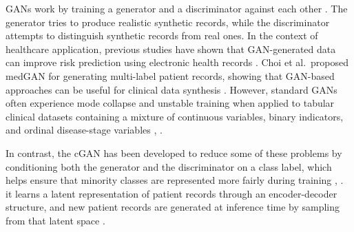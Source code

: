 GANs work by training a generator and a discriminator against each other \cite{vega2020}. The generator tries to produce realistic synthetic records, while the discriminator attempts to distinguish synthetic records from real ones. In the context of healthcare application, previous studies have shown that GAN-generated data can improve risk prediction using electronic health records \cite{che2017}. Choi et al.\ proposed medGAN for generating multi-label patient records, showing that GAN-based approaches can be useful for clinical data synthesis \cite{choi2017}. However, standard GANs often experience mode collapse and unstable training when applied to tabular clinical datasets containing a mixture of continuous variables, binary indicators, and ordinal disease-stage variables \cite{lenz2021}, \cite{espinosa2023}.

In contrast, the cGAN has been developed to reduce some of these problems by conditioning both the generator and the discriminator on a class label, which helps ensure that minority classes are represented more fairly during training \cite{vega2020}, \cite{sharma2024}.  it learns a latent representation of patient records through an encoder-decoder structure, and new patient records are generated at inference time by sampling from that latent space \cite{nikolentzos2023}.

%
%

